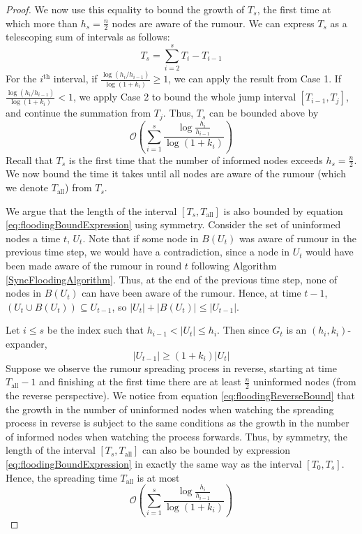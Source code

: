 \begin{proof}
	We now use this equality to bound the growth of $T_s$, the first time at which more than $h_s = \frac{n}{2}$ nodes are aware of the rumour. We can express $T_s$ as a telescoping sum of intervals as follows:
	$$
		T_s = \sum_{i=2}^s T_i - T_{i-1}
	$$
	For the $i^\text{th}$ interval, if $\frac{\log (h_i/h_{i-1})}{\log(1+k_i)} \geq 1$, we can apply the result from Case 1. If $\frac{\log (h_i/h_{i-1})}{\log(1+k_i)} < 1$, we apply Case 2 to bound the whole jump interval $[T_{i-1}, T_j]$, and continue the summation from $T_j$. %
	Thus, $T_s$ can be bounded above by
	\begin{equation}\label{eq:floodingBoundExpression}
		\mathcal{O}\left(\sum_{i=1}^s \frac{\log \frac{h_i}{h_{i-1}}}{\log(1+k_i)}\right)
	\end{equation}
	Recall that $T_s$ is the first time that the number of informed nodes exceeds $h_s = \frac{n}{2}$. We now bound the time it takes until all nodes are aware of the rumour (which we denote $T_\text{all}$) from $T_s$.

	We argue that the length of the interval $[T_s, T_\text{all}]$ is also bounded by equation \ref{eq:floodingBoundExpression} using symmetry. Consider the set of uninformed nodes a time $t$, $U_t$. Note that if some node in $B(U_t)$ was aware of rumour in the previous time step, we would have a contradiction, since a node in $U_t$ would have been made aware of the rumour in round $t$ following Algorithm \ref{SyncFloodingAlgorithm}.
	Thus, at the end of the previous time step, none of nodes in $B(U_t)$ can have been aware of the rumour.
	Hence, at time $t-1$, $(U_t \cup B(U_t)) \subseteq U_{t-1}$, so $|U_t| + |B(U_t)| \leq |U_{t-1}|$.
	
	Let $i \leq s$ be the index such that $h_{i-1}< |U_t| \leq h_i$. Then since $G_t$ is an $(h_i, k_i)$-expander, 
	\begin{equation} \label{eq:floodingReverseBound}
		|U_{t-1}| \geq (1 + k_i)|U_t|
	\end{equation}
	Suppose we observe the rumour spreading process in reverse, starting at time $T_\text{all} - 1$ and finishing at the first time there are at least $\frac{n}{2}$ uninformed nodes (from the reverse perspective). We notice from equation \ref{eq:floodingReverseBound} that the growth in the number of uninformed nodes when watching the spreading process in reverse is subject to the same conditions as the growth in the number of informed nodes when watching the process forwards. Thus, by symmetry, the length of the interval $[T_s, T_\text{all}]$ can also be bounded by expression \ref{eq:floodingBoundExpression} in exactly the same way as the interval $[T_0, T_s]$. Hence, the spreading time $T_\text{all}$ is at most
	$$
		\mathcal{O}\left(\sum_{i=1}^s \frac{\log \frac{h_i}{h_{i-1}}}{\log(1+k_i)}\right)
	$$
\end{proof}

